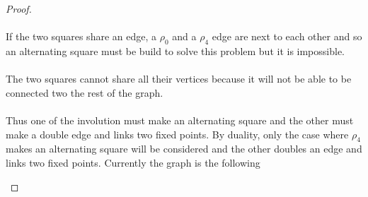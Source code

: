 \begin{proof}
\paragraph{}
If the two squares share an edge, a $\rho_0$ and a $\rho_4$ edge are next to each other and so an alternating square must be build to solve this problem but it is impossible.

\paragraph{}
The two squares cannot share all their vertices because it will not be able to be connected two the rest of the graph.

\paragraph{}
Thus one of the involution must make an alternating square and the other must make a double edge and links two fixed points. By duality, only the case where $\rho_4$ makes an alternating square will be considered and the other doubles an edge and links two fixed points. Currently the graph is the following

\begin{figure}[H]
  \begin{center}
\end{center}
\end{figure}
\end{proof}
